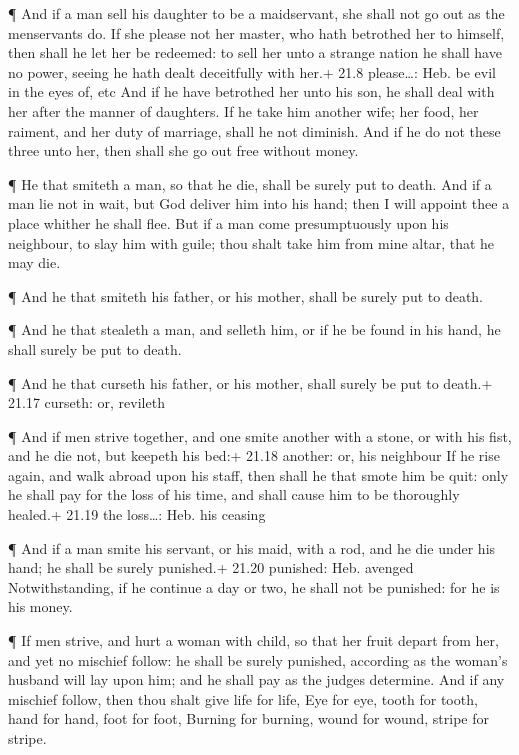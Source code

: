  ¶ And if a man sell his daughter to be a maidservant, she
shall not go out as the menservants do.  If she please not
her master, who hath betrothed her to himself, then shall he let her be
redeemed: to sell her unto a strange nation he shall have no power,
seeing he hath dealt deceitfully with her.+ 21.8 please\ldots: Heb. be
evil in the eyes of, etc  And if he have betrothed her unto
his son, he shall deal with her after the manner of daughters.
 If he take him another wife; her food, her raiment, and
her duty of marriage, shall he not diminish.  And if he do
not these three unto her, then shall she go out free without money.

 ¶ He that smiteth a man, so that he die, shall be surely
put to death.  And if a man lie not in wait, but God
deliver him into his hand; then I will appoint thee a place whither he
shall flee.  But if a man come presumptuously upon his
neighbour, to slay him with guile; thou shalt take him from mine altar,
that he may die.

 ¶ And he that smiteth his father, or his mother, shall be
surely put to death.

 ¶ And he that stealeth a man, and selleth him, or if he be
found in his hand, he shall surely be put to death.

 ¶ And he that curseth his father, or his mother, shall
surely be put to death.+ 21.17 curseth: or, revileth

 ¶ And if men strive together, and one smite another with a
stone, or with his fist, and he die not, but keepeth his bed:+ 21.18
another: or, his neighbour  If he rise again, and walk
abroad upon his staff, then shall he that smote him be quit: only he
shall pay for the loss of his time, and shall cause him to be thoroughly
healed.+ 21.19 the loss\ldots: Heb. his ceasing

 ¶ And if a man smite his servant, or his maid, with a rod,
and he die under his hand; he shall be surely punished.+ 21.20 punished:
Heb. avenged  Notwithstanding, if he continue a day or two,
he shall not be punished: for he is his money.

 ¶ If men strive, and hurt a woman with child, so that her
fruit depart from her, and yet no mischief follow: he shall be surely
punished, according as the woman's husband will lay upon him; and he
shall pay as the judges determine.  And if any mischief
follow, then thou shalt give life for life,  Eye for eye,
tooth for tooth, hand for hand, foot for foot,  Burning for
burning, wound for wound, stripe for stripe.

